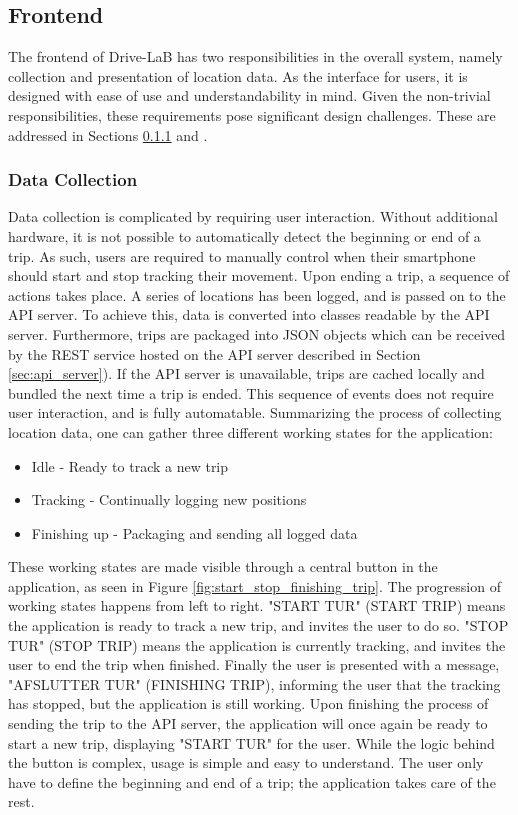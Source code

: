 \subsection{Frontend}\label{subsec:frontend_design}
The frontend of Drive-LaB has two responsibilities in the overall system, namely collection and presentation of location data. As the interface for users, it is designed with ease of use and understandability in mind. Given the non-trivial responsibilities, these requirements pose significant design challenges. These are addressed in Sections \ref{subsubsec:design_datacollection} and \label{subsubsec:design_datapresentation}.

\subsubsection{Data Collection}\label{subsubsec:design_datacollection}
Data collection is complicated by requiring user interaction. Without additional hardware, it is not possible to automatically detect the beginning or end of a trip. As such, users are required to manually control when their smartphone should start and stop tracking their movement.
Upon ending a trip, a sequence of actions takes place. A series of locations has been logged, and is passed on to the API server. To achieve this, data is converted into classes readable by the API server. Furthermore, trips are packaged into JSON objects which can be received by the REST service hosted on the API server described in Section \ref{sec:api_server}). If the API server is unavailable, trips are cached locally and bundled the next time a trip is ended. This sequence of events does not require user interaction, and is fully automatable. Summarizing the process of collecting location data, one can gather three different working states for the application:

\begin{itemize}
\item Idle - Ready to track a new trip
\item Tracking - Continually logging new positions
\item Finishing up - Packaging and sending all logged data
\end{itemize}

These working states are made visible through a central button in the application, as seen in Figure \ref{fig:start_stop_finishing_trip}. The progression of working states happens from left to right. "START TUR" (START TRIP) means the application is ready to track a new trip, and invites the user to do so. "STOP TUR" (STOP TRIP) means the application is currently tracking, and invites the user to end the trip when finished. Finally the user is presented with a message, "AFSLUTTER TUR" (FINISHING TRIP), informing the user that the tracking has stopped, but the application is still working. Upon finishing the process of sending the trip to the API server, the application will once again be ready to start a new trip, displaying "START TUR" for the user.
While the logic behind the button is complex, usage is simple and easy to understand. The user only have to define the beginning and end of a trip; the application takes care of the rest.

